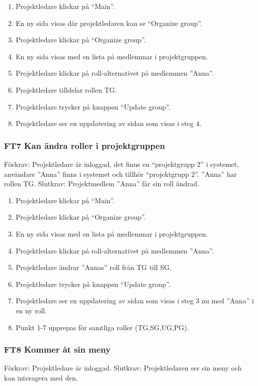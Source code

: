 \documentclass[paper=a4, fontsize=11pt,twoside]{article}
\begin{document}
	\begin{enumerate}
	 \item Projektledare klickar på “Main”.
	\item En ny sida visas där projektledaren kan se “Organize group”.
	\item Projektledare klickar på “Organize group”.
	\item En ny sida visas med en lista på medlemmar i projektgruppen.
	\item Projektledare klickar på roll-alternativet på medlemmen ”Anna”.
	\item Projektledare tilldelar rollen TG.
	\item Projektledare trycker på knappen “Update group”.
	\item Projektledare ser en uppdatering av sidan som visas i steg 4. 
	  
	\end{enumerate}

	\subsubsection*{FT7 Kan ändra roller i projektgruppen }
	
	Förkrav: Projektledare är inloggad, det finns en “projektgrupp 2” i systemet,
	användare  ”Anna” finns i systemet och tillhör “projektgrupp 2”. ”Anna” har rollen TG.
	\newline
	Slutkrav: Projektmedlem ”Anna” får sin roll ändrad.
	
	\begin{enumerate}
	\item Projektledare klickar på “Main”.
	\item Projektledare klickar på “Organize group”.
	\item En ny sida visas med en lista på medlemmar i projektgruppen.
	\item Projektledare klickar på roll-alternativet på medlemmen ”Anna”.
	\item Projektledare ändrar ”Annas” roll från TG till SG.
	\item Projektledare trycker på knappen “Update group”.
	\item Projektledare ser en uppdatering av sidan som visas i steg 3 nu med ”Anna”
	i en ny roll.
	\item Punkt 1-7 upprepas för samtliga roller (TG,SG,UG,PG).
	  
	\end{enumerate}
	
	\subsubsection*{FT8 Kommer åt sin meny}
	Förkrav: Projektledare är inloggad.
	\newline
	Slutkrav: Projektledaren ser sin meny och kan interagera med den.
	
\end{document}

